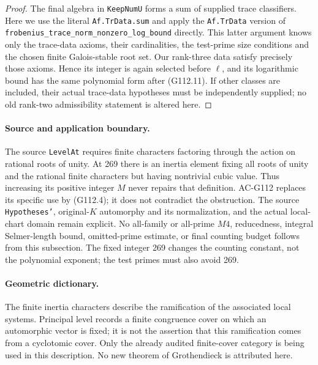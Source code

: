 \begin{proof}
The final algebra in \texttt{KeepNumU} forms a sum of supplied
trace classifiers.  Here we use the literal \texttt{Af.TrData.sum}
and apply the \texttt{Af.TrData} version of
\texttt{frobenius\_trace\_norm\_nonzero\_log\_bound} directly.  This latter
argument knows only the trace-data axioms, their cardinalities, the
test-prime size conditions and the chosen finite Galois-stable root
set.  Our rank-three data satisfy precisely those axioms.  Hence its
integer is again selected before \(\ell\), and its logarithmic bound
has the same polynomial form after (G112.11).  If other classes are
included, their actual trace-data hypotheses must be independently
supplied; no old rank-two admissibility statement is altered here.
\end{proof}

\paragraph{Source and application boundary.}
The source \texttt{LevelAt} requires finite characters factoring through
the action on rational roots of unity.  At 269 there is an inertia
element fixing all roots of unity and the rational finite characters
but having nontrivial cubic value.  Thus increasing its positive
integer \(M\) never repairs that definition.  AC-G112 replaces its
specific use by (G112.4); it does not contradict the obstruction.
The source \texttt{Hypotheses'}, original-\(K\) automorphy and its
normalization, and the actual local-chart domain remain explicit.
No all-family or all-prime \(M4\), reducedness, integral Selmer-length
bound, omitted-prime estimate, or final counting budget follows from
this subsection.  The fixed integer 269 changes the counting constant,
not the polynomial exponent; the test primes must also avoid 269.

\paragraph{Geometric dictionary.}
The finite inertia characters describe the ramification of the
associated local systems.  Principal level records a finite
congruence cover on which an automorphic vector is fixed; it is not
the assertion that this ramification comes from a cyclotomic cover.
Only the already audited finite-cover category is being used in this
description.  No new theorem of Grothendieck is attributed here.
